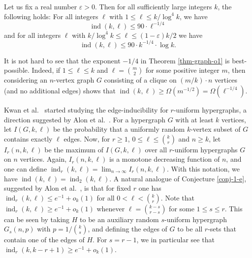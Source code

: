 \begin{theorem}\label{thm-graph-o1}Let us fix a real number $\varepsilon>0$. Then for all sufficiently large integers $k$, the following holds: For all integers $\ell$ with $1\leq \ell\leq k/\log^4 k$, we have
\[\operatorname{ind}(k,\ell)\leq 90\cdot \ell^{-1/4}\]
and for all integers $\ell$ with $k/\log^4 k \leq \ell\leq (1-\varepsilon)k/2$ we have
\[\operatorname{ind}(k,\ell)\leq 90\cdot k^{-1/4} \cdot \log k.\]
\end{theorem}

It is not hard to see that the exponent $-1/4$ in Theorem \ref{thm-graph-o1} is best-possible. Indeed, if $1\leq \ell\leq k$ and $\ell={m\choose 2}$ for some positive integer $m$, then considering an $n$-vertex graph $G$ consisting of a clique on $(m/k)\cdot n$ vertices (and no additional edges) shows that $\operatorname{ind}(k,\ell)\geq \Omega(m^{-1/2})=\Omega(\ell^{-1/4})$.

Kwan et al.\ \cite{kwan-et-al} started studying the edge-inducibility for $r$-uniform hypergraphs, a direction suggested by Alon et al.\ \cite{alon-et-al}. For a hypergraph $G$ with at least $k$ vertices, let $I(G,k,\ell)$ be the probability that a uniformly random $k$-vertex subset of $G$ contains exactly $\ell$ edges. Now, for $r\geq 1$, $0\leq \ell\leq {k\choose r}$ and $n\geq k$, let $I_r(n,k,\ell)$ be the maximum of $I(G,k,\ell)$ over all  $r$-uniform hypergraphs $G$ on $n$ vertices. Again, $I_r(n,k,\ell)$ is a monotone decreasing function of $n$, and one can define $\operatorname{ind}_r(k,\ell)=\lim_{n\to\infty} I_r(n,k,\ell)$. With this notation, we have $\operatorname{ind}(k,\ell)=\operatorname{ind}_2(k,\ell)$. A natural analogue of Conjecture \ref{conj-1-e}, suggested by Alon et al.\ \cite{alon-et-al}, is that for fixed $r$ one has $\operatorname{ind}_r(k,\ell)\leq e^{-1}+o_k(1)$ for all $0< \ell< {k\choose r}$. Note that $\operatorname{ind}_r(k,\ell)\geq e^{-1}+o_k(1)$ whenever $\ell={k-s\choose r-s}$ for some $1\leq s\leq r$. This can be seen by taking $H$ to be an auxiliary random $s$-uniform hypergraph $G_s(n,p)$ with $p=1/{k\choose s}$, and defining the edges of $G$ to be all $r$-sets that contain one of the edges of $H$. For $s=r-1$, we in particular see that $\operatorname{ind}_r(k,k-r+1)\geq e^{-1}+o_k(1)$.

